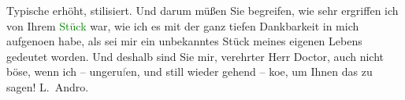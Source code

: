                Typische erhöht, stilisiert. Und darum müßen Sie begreifen, wie sehr ergriffen ich
               von Ihrem \textcolor{green}{Stück}{} war, wie ich {\pb}es mit der ganz tiefen Dankbarkeit in mich aufgeno{\geminationm}en habe, als sei mir ein unbekanntes Stück meines
               eigenen Lebens gedeutet worden. Und deshalb sind Sie mir, verehrter Herr Doctor, auch
               nicht böse, wenn ich – ungeru\textcolor{gray}{f}en, und still wieder gehend – ko{\geminationm}e, um Ihnen das zu sagen!\pend
           \pstart \spacefill\mbox{L. Andro.}\pend{}\endnumbering{}  
      